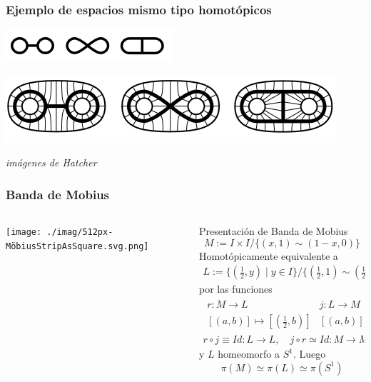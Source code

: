 \documentclass[xetex,mathserif,serif]{beamer}
\begin{document}
  \begin{frame}
    \frametitle{Ejemplo de espacios mismo tipo homotópicos}
    \begin{block}{}
      \centering
      \includegraphics{./imag/ThreeNonHomeoButHomotopyEquivGraphs.png}
    \end{block}

    \begin{block}{}
      \centering
      \includegraphics[scale=0.5]{./imag/HomotopyEquivalentsToBiAnnulus.png}
    \end{block}
    \begin{center}
      \emph{imágenes de Hatcher}
    \end{center}

  \end{frame}

  \begin{frame}
    \frametitle{Banda de Mobius}
    \begin{columns}
      \begin{column}{0.3\textwidth}
        \begin{center}
          \texttt{[image: ./imag/512px-MöbiusStripAsSquare.svg.png]}
        \end{center}
      \end{column}
      \begin{column}{0.7\textwidth}
        Presentación de Banda de Mobius
        \[ M := I \times I / \{(x,1) \sim (1 - x, 0)\}\]
        \pause
        Homotópicamente equivalente a
        \begin{gather*}
          L := \{ (\frac 1 2, y) \mid y \in I \} / \{ (\frac 1 2 , 1)
          \sim (\frac 1 2, 0)\}
        \end{gather*}
        por las funciones
        \begin{gather*}
          \begin{matrix}
            r : M \to L & j : L \to M \\
            [(a,b)] \mapsto [(\frac 1 2 , b)] & [(a,b)] \mapsto [(a,b)]
          \end{matrix} \\
          r \circ j \equiv Id : L \to L, \quad j \circ r \simeq Id : M \to M
        \end{gather*}
      y \(L\) homeomorfo a \(S^1\). Luego
      \[ \pi (M) \simeq \pi (L) \simeq \pi (S^1) \]
      \end{column}
    \end{columns}
  \end{frame}
\end{document}
